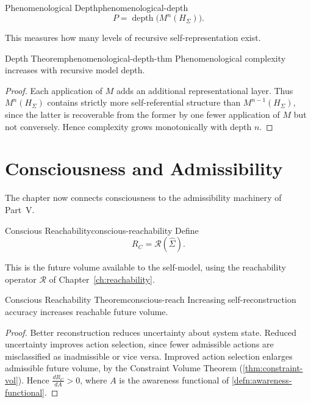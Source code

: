 \documentclass[12pt,twoside,openright]{book}
\newcommand{\reach}{\mathcal{R}}
\begin{document}
\begin{definition}{Phenomenological Depth}{phenomenological-depth}
  \[
    P = \operatorname{depth}\bigl(M^n(H_\Sigma)\bigr).
  \]
\end{definition}

This measures how many levels of recursive
self-representation exist.

\begin{theorem}{Depth Theorem}{phenomenological-depth-thm}
  Phenomenological complexity increases with recursive
  model depth.
\end{theorem}

\begin{proof}
  Each application of $M$ adds an additional representational
  layer. Thus $M^n(H_\Sigma)$ contains strictly more
  self-referential structure than $M^{n-1}(H_\Sigma)$, since
  the latter is recoverable from the former by one fewer
  application of $M$ but not conversely. Hence complexity
  grows monotonically with depth $n$.
\end{proof}

\section{Consciousness and Admissibility}
\label{sec:ch21-admissibility}

The chapter now connects consciousness to the admissibility
machinery of Part~V.

\begin{definition}{Conscious Reachability}{conscious-reachability}
  Define
  \[
    R_C = \reach(\hat{\Sigma}).
  \]
\end{definition}

This is the future volume available to the self-model,
using the reachability operator $\reach$ of
Chapter~\ref{ch:reachability}.

\begin{theorem}{Conscious Reachability Theorem}{conscious-reach}
  Increasing self-reconstruction accuracy increases
  reachable future volume.
\end{theorem}

\begin{proof}
  Better reconstruction reduces uncertainty about system
  state. Reduced uncertainty improves action selection,
  since fewer admissible actions are misclassified as
  inadmissible or vice versa. Improved action selection
  enlarges admissible future volume, by the Constraint
  Volume Theorem (\cref{thm:constraint-vol}). Hence
  $\frac{dR_C}{dA} > 0$, where $A$ is the awareness
  functional of \cref{defn:awareness-functional}.
\end{proof}
\end{document}
